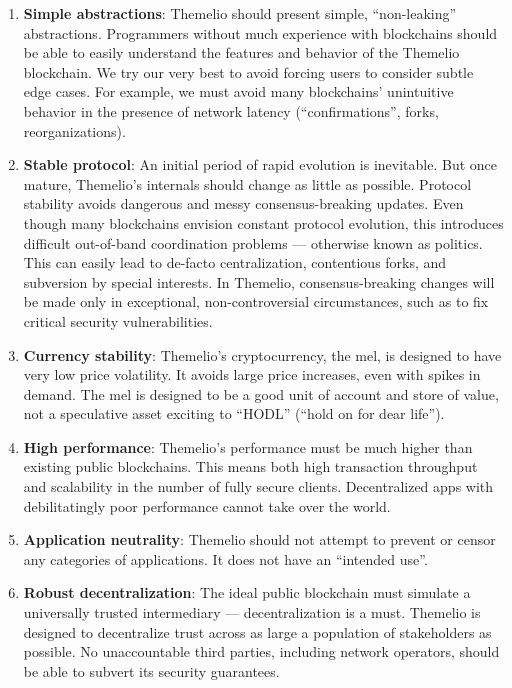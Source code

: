 \documentclass[]{article}
\providecommand{\tightlist}{%
  \setlength{\itemsep}{0pt}\setlength{\parskip}{0pt}}
\begin{document}
\begin{enumerate}
\def\labelenumi{\arabic{enumi}.}
\tightlist
\item
  \textbf{Simple abstractions}: Themelio should present simple,
  ``non-leaking'' abstractions. Programmers without much experience with
  blockchains should be able to easily understand the features and
  behavior of the Themelio blockchain. We try our very best to avoid
  forcing users to consider subtle edge cases. For example, we must
  avoid many blockchains' unintuitive behavior in the presence of
  network latency (``confirmations'', forks, reorganizations).
\item
  \textbf{Stable protocol}: An initial period of rapid evolution is
  inevitable. But once mature, Themelio's internals should change as
  little as possible. Protocol stability avoids dangerous and messy
  consensus-breaking updates. Even though many blockchains envision
  constant protocol evolution, this introduces difficult out-of-band
  coordination problems --- otherwise known as politics. This can easily
  lead to de-facto centralization, contentious forks, and subversion by
  special interests. In Themelio, consensus-breaking changes will be
  made only in exceptional, non-controversial circumstances, such as to
  fix critical security vulnerabilities.
\item
  \textbf{Currency stability}: Themelio's cryptocurrency, the mel, is
  designed to have very low price volatility. It avoids large price
  increases, even with spikes in demand. The mel is designed to be a
  good unit of account and store of value, not a speculative asset
  exciting to ``HODL'' (``hold on for dear life'').
\item
  \textbf{High performance}: Themelio's performance must be much higher
  than existing public blockchains. This means both high transaction
  throughput and scalability in the number of fully secure clients.
  Decentralized apps with debilitatingly poor performance cannot take
  over the world.
\item
  \textbf{Application neutrality}: Themelio should not attempt to
  prevent or censor any categories of applications. It does not have an
  ``intended use''.
\item
  \textbf{Robust decentralization}: The ideal public blockchain must
  simulate a universally trusted intermediary --- decentralization is a
  must. Themelio is designed to decentralize trust across as large a
  population of stakeholders as possible. No unaccountable third
  parties, including network operators, should be able to subvert its
  security guarantees.
\end{enumerate}
\end{document}
